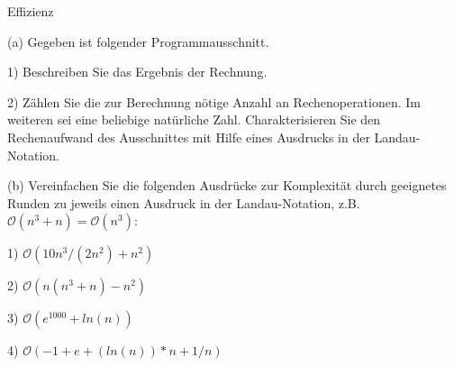 \begin{exercise}{Effizienz}

\begin{body}
\begin{parts}
  \item[(a)] Gegeben ist folgender Programmausschnitt.
  \begin{parts}
  \item[1)] Beschreiben Sie das Ergebnis der Rechnung.
  \item[2)] Z\"ahlen Sie die zur Berechnung n\"otige Anzahl an Rechenoperationen.
            Im weiteren sei  eine beliebige nat\"urliche Zahl.
            Charakterisieren Sie den Rechenaufwand des Ausschnittes mit Hilfe eines Ausdrucks in der Landau-Notation.

  \end{parts}
\end{parts}


\begin{parts}
  \item [(b)] Vereinfachen Sie die folgenden Ausdr\"ucke zur Komplexit\"at durch geeignetes Runden zu jeweils einen Ausdruck in der Landau-Notation, z.B. $\mathcal{O}(n^3+n) = \mathcal{O}(n^3)$:
  \begin{parts}
    \item [1)] $\mathcal{O}(10n^3/(2n^2)+n^2)$
    \item [2)] $\mathcal{O}(n(n^3+n)-n^2)$
    \item [3)] $\mathcal{O}(e^{1000}+ln (n))$
    \item [4)] $\mathcal{O}(-1+e+(ln(n))*n +1/n )$
  \end{parts}
\end{parts}


\end{body}
\end{exercise}
